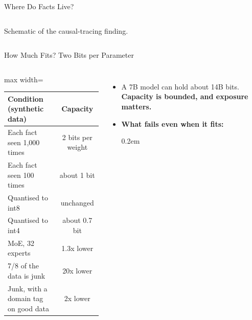 \begin{frame}{Where Do Facts Live?}
\begin{columns}[T,onlytextwidth]
        {\scriptsize Schematic of the causal-tracing finding.}
    \end{columns}
    \vspace{0.2em}
\end{frame}

\begin{frame}{How Much Fits? Two Bits per Parameter}
    \begin{columns}[T,onlytextwidth]
        \centering
        \small
        \renewcommand{\arraystretch}{1.15}
        \footnotesize\setlength{\tabcolsep}{3pt}\begin{adjustbox}{max width=\linewidth}\begin{tabular}{lc}
            \toprule
            \textbf{Condition (synthetic data)} & \textbf{Capacity} \\
            \midrule
            \rowcolor{KAUSTcyan!12} Each fact seen 1,000 times & 2 bits per weight \\
            Each fact seen 100 times & about 1 bit \\
            Quantised to int8 & unchanged \\
            Quantised to int4 & about 0.7 bit \\
            MoE, 32 experts & 1.3x lower \\
            7/8 of the data is junk & 20x lower \\
            Junk, with a domain tag on good data & 2x lower \\
            \bottomrule
        \end{tabular}\end{adjustbox}
        \begin{itemize}\itemsep0.45em
            \item A 7B model can hold about 14B bits. \textbf{Capacity is bounded, and exposure matters.}
            \item \textbf{What fails even when it fits:}
            \begin{itemize}\itemsep0.2em

\end{itemize}
\end{itemize}
\end{columns}
\end{frame}
